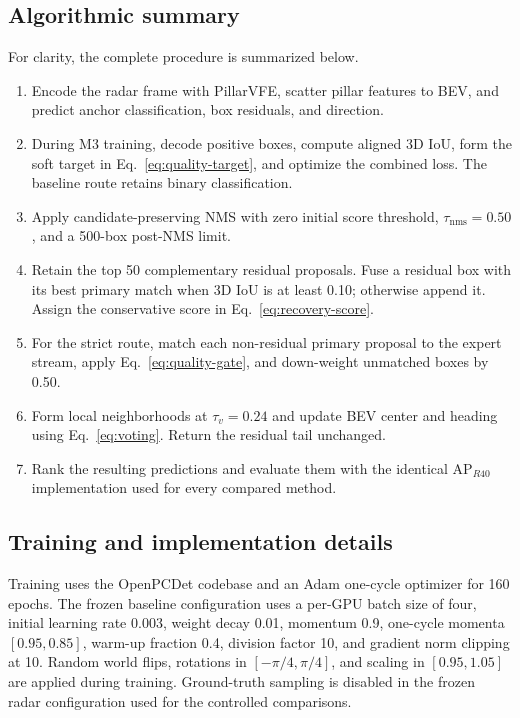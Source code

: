 \documentclass[preprint,12pt,times]{elsarticle}
\begin{document}
\subsection{Algorithmic summary}

For clarity, the complete procedure is summarized below.
\begin{enumerate}[leftmargin=*,label=\textbf{Step \arabic*:}]
\item Encode the radar frame with PillarVFE, scatter pillar features to BEV,
and predict anchor classification, box residuals, and direction.
\item During M3 training, decode positive boxes, compute aligned 3D IoU, form
the soft target in Eq.~\eqref{eq:quality-target}, and optimize the combined
loss. The baseline route retains binary classification.
\item Apply candidate-preserving NMS with zero initial score threshold,
$\tau_{\mathrm{nms}}=0.50$, and a 500-box post-NMS limit.
\item Retain the top 50 complementary residual proposals. Fuse a residual box
with its best primary match when 3D IoU is at least 0.10; otherwise append it.
Assign the conservative score in Eq.~\eqref{eq:recovery-score}.
\item For the strict route, match each non-residual primary proposal to the
expert stream, apply Eq.~\eqref{eq:quality-gate}, and down-weight unmatched
boxes by 0.50.
\item Form local neighborhoods at $\tau_v=0.24$ and update BEV center and
heading using Eq.~\eqref{eq:voting}. Return the residual tail unchanged.
\item Rank the resulting predictions and evaluate them with the identical
AP$_{R40}$ implementation used for every compared method.
\end{enumerate}

\subsection{Training and implementation details}

Training uses the OpenPCDet codebase and an Adam one-cycle optimizer for 160
epochs. The frozen baseline configuration uses a per-GPU batch size of four,
initial learning rate 0.003, weight decay 0.01, momentum 0.9, one-cycle
momenta $[0.95,0.85]$, warm-up fraction 0.4, division factor 10, and gradient
norm clipping at 10. Random world flips, rotations in
$[-\pi/4,\pi/4]$, and scaling in $[0.95,1.05]$ are applied during training.
Ground-truth sampling is disabled in the frozen radar configuration used for
the controlled comparisons.
\end{document}
